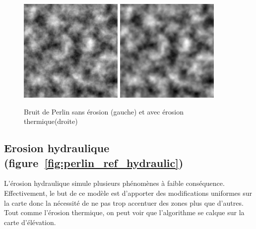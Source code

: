 \begin{figure}[!ht]
  \begin{center}
	\includegraphics[width=5cm]{resources/perlin_ref.png}\hfill
	\includegraphics[width=5cm]{resources/perlin_thermalerosion.png}\hfill
        \caption{Bruit de Perlin sans érosion (gauche) et avec érosion thermique(droite)}
        \label{fig:perlin_ref_thermal}
   \end{center}
\end{figure}


\subsection{Erosion hydraulique (figure~\ref{fig:perlin_ref_hydraulic})}
L'érosion hydraulique simule plusieurs phénomènes à faible conséquence.
Effectivement, le but de ce modèle est d'apporter des 
modifications uniformes sur la carte donc la nécessité de ne pas trop accentuer des zones plus que d'autres.
Tout comme l'érosion thermique, on peut voir que l'algorithme se calque sur la carte d'élévation.

